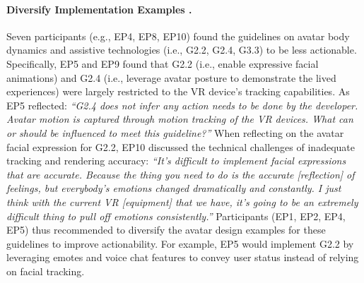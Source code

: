 

\paragraph{\textbf{Diversify Implementation Examples .}}
Seven participants (e.g., EP4, EP8, EP10) found the guidelines on avatar body dynamics and assistive technologies (i.e., G2.2, G2.4, G3.3) %
to be less actionable. Specifically, EP5 and EP9 found that G2.2 (i.e., enable expressive facial animations) and G2.4 (i.e., leverage avatar posture to demonstrate the lived experiences) were largely restricted to the VR device's tracking capabilities. As EP5 reflected: \textit{``G2.4 does not infer any action needs to be done by the developer. Avatar motion is captured through motion tracking of the VR devices. What can or should be influenced to meet this guideline?''} When reflecting on the avatar facial expression for G2.2, EP10 discussed the technical challenges of inadequate tracking and rendering accuracy: \textit{``It's difficult to implement facial expressions that are accurate. Because the thing you need to do is the accurate [reflection] of feelings, but everybody's emotions changed dramatically and constantly. I just think with the current VR [equipment] that we have, it's going to be an extremely difficult thing to pull off emotions consistently.''}
Participants (EP1, EP2, EP4, EP5) thus recommended to diversify the avatar design examples for these guidelines to improve actionability. For example, EP5 would implement G2.2 by leveraging emotes and voice chat features to convey user status instead of relying on facial tracking. 

